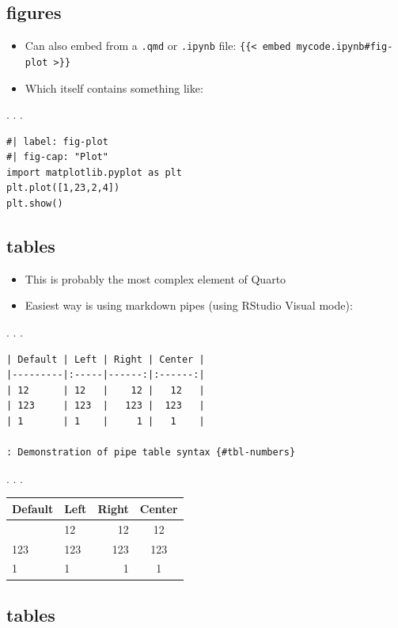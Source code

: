 \documentclass[
  letterpaper,
  DIV=11,
  numbers=noendperiod]{scrartcl}
\begin{document}
\subsection{figures}\label{figures-2}

\begin{itemize}
\item
  Can also embed from a \texttt{.qmd} or \texttt{.ipynb} file:
  \texttt{\{\{\textless{}\ embed\ mycode.ipynb\#fig-plot\ \textgreater{}\}\}}
\item
  Which itself contains something like:
\end{itemize}

. . .

\begin{verbatim}
#| label: fig-plot
#| fig-cap: "Plot"
import matplotlib.pyplot as plt
plt.plot([1,23,2,4])
plt.show()
\end{verbatim}

\subsection{tables}\label{tables}

\begin{itemize}
\item
  This is probably the most complex element of Quarto
\item
  Easiest way is using markdown pipes (using RStudio Visual mode):
\end{itemize}

. . .

\begin{verbatim}
| Default | Left | Right | Center |
|---------|:-----|------:|:------:|
| 12      | 12   |    12 |   12   |
| 123     | 123  |   123 |  123   |
| 1       | 1    |     1 |   1    |

: Demonstration of pipe table syntax {#tbl-numbers}
\end{verbatim}

. . .

\begin{longtable}[]{@{}llrc@{}}
\toprule\noalign{}
Default & Left & Right & Center \\
\midrule\noalign{}
\endhead
\bottomrule\noalign{}
\endlastfoot
12 & 12 & 12 & 12 \\
123 & 123 & 123 & 123 \\
1 & 1 & 1 & 1 \\
\end{longtable}

\subsection{tables}\label{tables-1}
\end{document}
